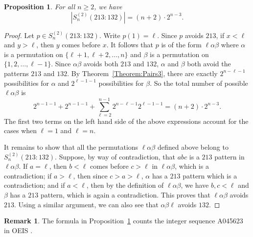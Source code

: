 \documentclass[11pt]{article}
\newtheorem{proposition}[theorem]{Proposition}
\theoremstyle{definition}
\newtheorem{remark}[theorem]{Remark}
\numberwithin{equation}{section}
\begin{document}
\begin{proposition}\label{Prop:213;132}
    For all $n\geq2$, we have
    \[
    |S_n^{(2)}(213:132)|=(n+2)\cdot2^{n-3}.
    \]
\end{proposition}
\begin{proof}
    Let $p\in S_n^{(2)}(213:132)$. Write $p(1)=\ell$. Since $p$ avoids $213$, if $x<\ell$ and $y>\ell$, then $y$ comes before $x$. It follows that $p$ is of the form $\ell\alpha\beta$ where $\alpha$ is a permutation on $\{\ell+1,\ell+2,\ldots,n\}$ and $\beta$ is a permutation on $\{1,2,\ldots,\ell-1\}$. Since $\alpha\beta$ avoids both $213$ and $132$, $\alpha$ and $\beta$ both avoid the patterns $213$ and $132$. By Theorem~\ref{Theorem:Pairs3}, there are exactly $2^{n-\ell-1}$ possibilities for $\alpha$ and $2^{\ell-1-1}$ possibilities for $\beta$. So the total number of possible $\ell\alpha\beta$ is
    \[
    2^{n-1-1}+2^{n-1-1}+\sum_{\ell=2}^{n-1}2^{n-\ell-1}2^{\ell-1-1}=(n+2)\cdot2^{n-3}.
    \]
    The first two terms on the left hand side of the above expressions account for the cases when $\ell=1$ and $\ell=n$.

    It remains to show that all the permutations $\ell\alpha\beta$ defined above belong to $S_n^{(2)}(213:132)$. Suppose, by way of contradiction, that $abc$ is a $213$ pattern in $\ell\alpha\beta$. If $a=\ell$, then $b<\ell$ comes before $c>\ell$ in $\ell\alpha\beta$, which is a contradiction; if $a>\ell$, then since $c>a>\ell$, $\alpha$ has a $213$ pattern which is a contradiction; and if $a<\ell$, then by the definition of $\ell\alpha\beta$, we have $b,c<\ell$ and $\beta$ has a $213$ pattern, which is again a contradiction. This proves that $\ell\alpha\beta$ avoids $213$. Using a similar argument, we can also see that $\alpha\beta\ell$ avoids $132$.
\end{proof}

\begin{remark}
The formula in Proposition~\ref{Prop:213;132} counts the integer sequence A045623 in OEIS \cite{OEIS}.
\end{remark}
\end{document}
